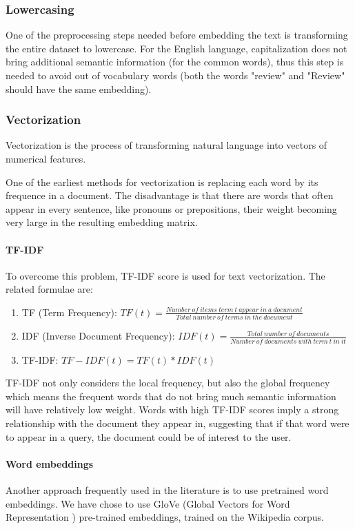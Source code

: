 \subsubsection{Lowercasing}
One of the preprocessing steps needed before embedding the text is transforming the entire dataset to lowercase. For the English language, capitalization does not bring additional semantic information (for the common words), thus this step is needed to avoid out of vocabulary words (both the words "review" and "Review" should have the same embedding).

\subsubsection{Vectorization}
Vectorization is the process of transforming natural language into vectors of numerical features.

One of the earliest methods for vectorization is replacing each word by its frequence in a document. The disadvantage is that there are words that often appear in every sentence, like pronouns or prepositions, their weight becoming very large in the resulting embedding matrix.
\paragraph{TF-IDF}\label{tfidf}
To overcome this problem, TF-IDF score is used for text vectorization. The related formulae are:
\begin{enumerate}
    \item TF (Term Frequency):
    $TF(t)=\frac{Number\ of\ items\ term\ t\ appear\ in\ a\ document}{Total\ number\ of\ terms\ in\ the\ document}$
    \item IDF (Inverse Document Frequency):
    $IDF(t)=\frac{Total\ number\ of\ documents}{Number\ of\ documents\ with\ term\ t\ in\ it}$
    \item TF-IDF:
    $TF-IDF(t)=TF(t)*IDF(t)$
\end{enumerate}
TF-IDF not only considers the local frequency, but also the global frequency which means the frequent words that do not bring much semantic information will have relatively low weight. Words with high TF-IDF scores imply a strong relationship with the document they appear in, suggesting that if that word were to appear in a query, the document could be of interest to the user.\cite{TF-IDF}

\paragraph{Word embeddings}
Another approach frequently used in the literature is to use pretrained word embeddings. We have chose to use GloVe (Global Vectors for Word Representation \cite{glove}) pre-trained embeddings, trained on the Wikipedia corpus.